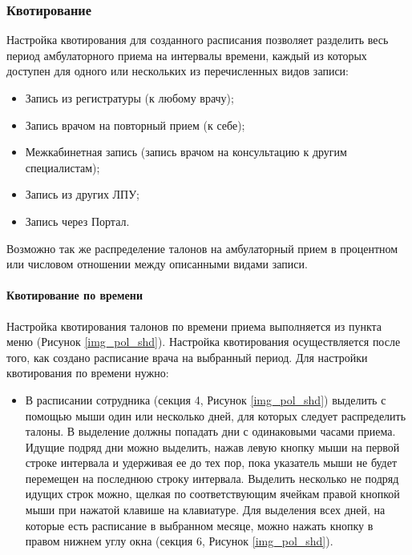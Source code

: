 \subsubsection{Квотирование} \label{pol_shdkv}

Настройка квотирования для созданного расписания позволяет разделить весь период амбулаторного приема на интервалы времени, каждый из которых доступен для одного или нескольких из перечисленных видов записи:
\begin{itemize}
 \item Запись из регистратуры (к любому врачу);
 \item Запись врачом на повторный прием (к себе);
 \item Межкабинетная запись (запись врачом на консультацию к другим специалистам);
 \item Запись из других ЛПУ;
 \item Запись через Портал. 
\end{itemize}
 
Возможно так же распределение талонов на амбулаторный прием в процентном или числовом отношении между описанными видами записи.

\paragraph{Квотирование по времени}

Настройка квотирования талонов по времени приема выполняется из пункта меню  (Рисунок \ref{img_pol_shd}). Настройка квотирования осуществляется после того, как создано расписание врача на выбранный период. Для настройки квотирования по времени нужно:
\begin{itemize}
 \item В расписании сотрудника (секция 4, Рисунок \ref{img_pol_shd}) выделить с помощью мыши один или несколько дней, для которых следует распределить талоны. В выделение должны попадать дни с одинаковыми часами приема. Идущие подряд дни можно выделить, нажав левую кнопку мыши на первой строке интервала и удерживая ее до тех пор, пока указатель мыши не будет перемещен на последнюю строку интервала. Выделить несколько не подряд идущих строк можно, щелкая по соответствующим ячейкам правой кнопкой мыши при нажатой клавише  на клавиатуре. Для выделения всех дней, на которые есть расписание в выбранном месяце, можно нажать кнопку   в правом нижнем углу окна (секция 6, Рисунок \ref{img_pol_shd}).
\end{itemize}

